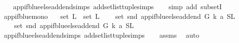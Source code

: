 \begin{isabellebody}
%
\isadelimproof
\ \ %
\endisadelimproof
%
\isatagproof
{}\isamarkupfalse%
\ app{\isacharunderscore}{\kern0pt}if{\isacharunderscore}{\kern0pt}blue{\isacharunderscore}{\kern0pt}else{\isacharunderscore}{\kern0pt}add{\isacharunderscore}{\kern0pt}end{\isachardot}{\kern0pt}simps\ add{\isacharunderscore}{\kern0pt}set{\isacharunderscore}{\kern0pt}list{\isacharunderscore}{\kern0pt}tuple{\isachardot}{\kern0pt}simps\isanewline
\ \ \isamarkupfalse%
\ {\isacharparenleft}{\kern0pt}simp\ add{\isacharcolon}{\kern0pt}\ subsetI{\isacharparenright}{\kern0pt}%
\endisatagproof
{\isafoldproof}%
%
\isadelimproof
\isanewline
%
\endisadelimproof
\isanewline
{}\isamarkupfalse%
\ app{\isacharunderscore}{\kern0pt}if{\isacharunderscore}{\kern0pt}blue{\isacharunderscore}{\kern0pt}mono{}{\isacharcolon}{\kern0pt}\isanewline
\ \ \ {\isachardoublequoteopen}set\ L{}\ {\isasymsubseteq}\ set\ L{}{\isachardoublequoteclose}\isanewline
\ \ \ \ {\isachardoublequoteopen}set\ {\isacharparenleft}{\kern0pt}snd\ {\isacharparenleft}{\kern0pt}app{\isacharunderscore}{\kern0pt}if{\isacharunderscore}{\kern0pt}blue{\isacharunderscore}{\kern0pt}else{\isacharunderscore}{\kern0pt}add{\isacharunderscore}{\kern0pt}end\ G\ k\ a\ {\isacharparenleft}{\kern0pt}S{\isacharcomma}{\kern0pt}L{}{\isacharparenright}{\kern0pt}{\isacharparenright}{\kern0pt}{\isacharparenright}{\kern0pt}\isanewline
\ \ \ {\isasymsubseteq}\ set\ {\isacharparenleft}{\kern0pt}snd\ {\isacharparenleft}{\kern0pt}app{\isacharunderscore}{\kern0pt}if{\isacharunderscore}{\kern0pt}blue{\isacharunderscore}{\kern0pt}else{\isacharunderscore}{\kern0pt}add{\isacharunderscore}{\kern0pt}end\ G\ k\ a\ {\isacharparenleft}{\kern0pt}S{}{\isacharcomma}{\kern0pt}L{}{\isacharparenright}{\kern0pt}{\isacharparenright}{\kern0pt}{\isacharparenright}{\kern0pt}{\isachardoublequoteclose}\isanewline
%
\isadelimproof
\ \ %
\endisadelimproof
%
\isatagproof
{}\isamarkupfalse%
\ app{\isacharunderscore}{\kern0pt}if{\isacharunderscore}{\kern0pt}blue{\isacharunderscore}{\kern0pt}else{\isacharunderscore}{\kern0pt}add{\isacharunderscore}{\kern0pt}end{\isachardot}{\kern0pt}simps\ add{\isacharunderscore}{\kern0pt}set{\isacharunderscore}{\kern0pt}list{\isacharunderscore}{\kern0pt}tuple{\isachardot}{\kern0pt}simps\isanewline
\ \ \isamarkupfalse%
\ assms\ \isamarkupfalse%
\ auto%
\endisatagproof
{\isafoldproof}%
%
\isadelimproof
\isanewline
%
\endisadelimproof
\isanewline
\isanewline

\end{isabellebody}
